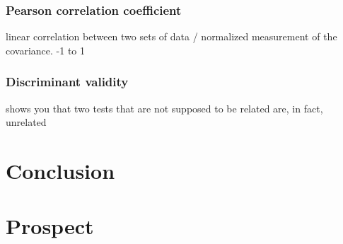 \subsection{Pearson correlation coefficient}
linear correlation between two sets of data / normalized measurement of the covariance. 
-1 to 1

\subsection{Discriminant validity}
shows you that two tests that are not supposed to be related are, in fact, unrelated









\chapter{Conclusion}

\chapter{Prospect}

